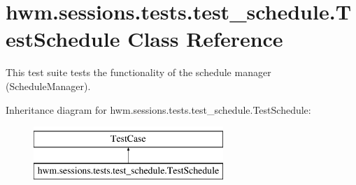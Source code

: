 \hypertarget{classhwm_1_1sessions_1_1tests_1_1test__schedule_1_1_test_schedule}{\section{hwm.\-sessions.\-tests.\-test\-\_\-schedule.\-Test\-Schedule Class Reference}
\label{classhwm_1_1sessions_1_1tests_1_1test__schedule_1_1_test_schedule}
}


This test suite tests the functionality of the schedule manager (Schedule\-Manager).  


Inheritance diagram for hwm.\-sessions.\-tests.\-test\-\_\-schedule.\-Test\-Schedule\-:\begin{figure}[H]
\begin{center}
\leavevmode
\includegraphics[height=2.000000cm]{classhwm_1_1sessions_1_1tests_1_1test__schedule_1_1_test_schedule}
\end{center}
\end{figure}
